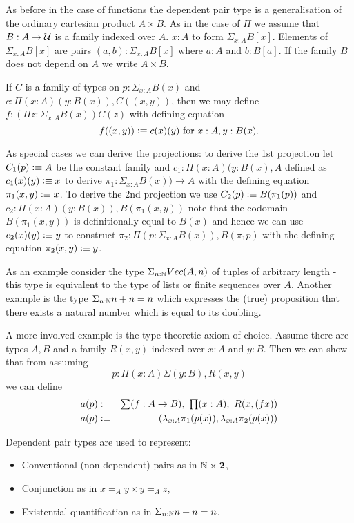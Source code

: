 {As before in the case of functions the dependent pair type is a
generalisation of the ordinary cartesian product $A \times B$. 
As in the case of $\Pi$ we assume that $B:A \to \mathcal{U}$ is a family
indexed over $A$.
$x:A$ to form $\Sigma_{x:A}B[x]$. Elements of $\Sigma_{x:A}B[x]$ are
pairs $(a,b) : \Sigma_{x:A}B[x]$ where $a:A$ and $b:B[a]$. If the
family $B$ does not depend on $A$ we write $A \times B$.

If $C$ is a family of types on $p:\Sigma_{x:A}B(x)$ and 
$c:\Pi(x:A)(y:B(x)),C((x,y))$, then we may define 
$f:(\Pi z:\Sigma_{x:A}B(x))C(z)$ with defining equation
  \[f((x,y))\vcentcolon\equiv c(x)(y)\mbox{ for } x:A,y:B(x).\]

As special cases we can derive the projections: to derive the 1st
projection let $C_1(p) \vcentcolon\equiv A$ be the constant family and $c_1 : \Pi (x:A)(y:B(x),A$
defined as $c_1(x)(y) \vcentcolon\equiv x$ to derive $\pi_1 : \Sigma_{x:A}B(x)) \to A$
with the defining equation $\pi_1 (x,y) \vcentcolon\equiv x$. To derive the 2nd
projection we use $C_2(p) \vcentcolon\equiv B (\pi_1(p))$ and $c_2 : \Pi
(x:A)(y:B(x)),B(\pi_1(x,y))$ note that the codomain $B(\pi_1(x,y))$ is
definitionally equal to $B(x)$ and hence we can use $c_2(x)(y) \vcentcolon\equiv
y$ to construct $\pi_2 : \Pi(p : \Sigma_{x:A}{B(x)}),B(\pi_1 p)$ with
the defining equation $\pi_2(x,y) \vcentcolon\equiv y$.

As an example consider the type $\Sigma_{n:\mathbb{N}}Vec(A,n)$ of tuples of
arbitrary length - this type is equivalent to the type of lists or
finite sequences over $A$. Another example is the type
$\Sigma_{n:\mathbb{N}}n+n = n$ which expresses the (true) proposition that
there exists a natural number which is equal to its doubling.

A more involved example is the type-theoretic axiom of choice. Assume
there are types $A,B$ and a family $R(x,y)$ indexed over $x:A$ and
$y:B$. Then we can show that from assuming 
\[p : \Pi(x:A)\Sigma(y :B),R(x,y)\] 
we can define 
\begin{eqnarray*}
a(p) & : & \sm{f : A \to B} \prd{x:A} R(x,(fx)) \\
a(p) & \defeq & (\lambda_{x:A} \pi_1(p(x)),\lambda_{x:A} \pi_2(p(x)))
\end{eqnarray*}

Dependent pair types are used to represent:
\begin{itemize}
\item Conventional (non-dependent) pairs as in $\mathbb{N} \times \mathbf{2}$,
\item Conjunction as in $x =_A y \times y =_A z$,
\item Existential quantification as in $\Sigma_{n:\mathbb{N}}n+n = n$.
\end{itemize}

}
